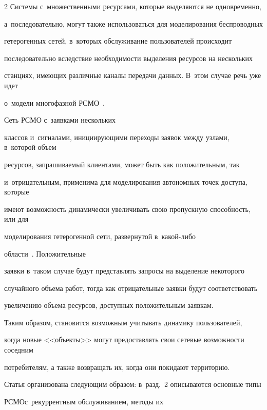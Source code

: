 \begin{multicols}{2}
Системы с~множественными ресурсами, которые выделяются не одновременно, 


а~последовательно, могут также использоваться для моделирования беспроводных 


гетерогенных сетей, в~которых обслуживание пользователей происходит 


последовательно вследствие необходимости выделения ресурсов на нескольких 


станциях, имеющих различные каналы передачи данных. В~этом случае речь уже идет 


о~модели многофазной РСМО~\cite{Mois_4_2017,Mois_5_2017}.








Сеть РСМО с~заявками нескольких 


классов и~сигналами, инициирующими переходы заявок между узлами, в~которой объем 


ресурсов, запрашиваемый клиентами, может быть как положительным, так 


и~отрицательным, применима для моделирования автономных точек доступа, которые 


имеют возможность динамически увеличивать свою пропускную способность, или для 


моделирования гетерогенной сети, развернутой в~ка\-кой-ли\-бо 


области~\cite{Sopin_12_2017,Sopin_13_2017,Naumov_14_2017,Naumov_15_2017}. Положительные 


заявки в~таком случае будут представлять запросы на выделение некоторого 


случайного объема работ, тогда как отрицательные заявки будут соответствовать 


увеличению объема ресурсов, доступных положительным заявкам.


Таким образом, становится возможным учитывать динамику пользователей,




когда новые <<объекты>> могут предоставлять свои сетевые возможности соседним 


потребителям, а также возвращать их, когда они покидают территорию.





Статья организована следующим образом: в~разд.~2 описываются основные типы 


РСМО\linebreak с~рекуррентным обслуживанием, методы их 



\end{multicols}
